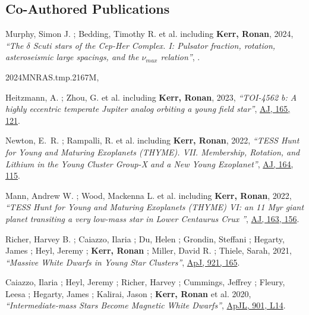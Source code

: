 \documentclass[12pt,a4paper,sans,xetex]{moderncv}        %
\begin{document}
\subsection{Co-Authored Publications}

\begin{etaremune}[topsep=0pt,itemsep=0pt,partopsep=0pt,parsep=0pt]

\item Murphy, Simon J. ;  Bedding, Timothy R. et al. including \textbf{Kerr, Ronan}, 2024, \textit{``The $\delta$ Scuti stars of the Cep-Her Complex. I: Pulsator fraction, rotation, asteroseismic large spacings, and the $\nu_{max}$ relation''}, \href{https://ui.adsabs.harvard.edu/abs/2024MNRAS.tmp.2167M/abstract}{}.

2024MNRAS.tmp.2167M,

\item Heitzmann, A. ; Zhou, G. et al. including \textbf{Kerr, Ronan}, 2023, \textit{``TOI-4562 b: A highly eccentric temperate Jupiter analog orbiting a young field star''}, 
\href{https://ui.adsabs.harvard.edu/abs/2023AJ....165..121H/abstract}{AJ, 165, 121}.

\item  Newton, E.~R. ; Rampalli, R. et al. including \textbf{Kerr, Ronan}, 2022, \textit{``TESS Hunt for Young and Maturing Exoplanets (THYME). VII. Membership, Rotation, and Lithium in the Young Cluster Group-X and a New Young Exoplanet''}, 
\href{https://ui.adsabs.harvard.edu/abs/2022AJ....164..115N/abstract}{AJ, 164, 115}.

\item  Mann, Andrew W. ;  Wood, Mackenna L. et al. including \textbf{Kerr, Ronan}, 2022, \textit{``TESS Hunt for Young and Maturing Exoplanets (THYME) VI: an 11 Myr giant planet transiting a very low-mass star in Lower Centaurus Crux ''}, 
\href{https://ui.adsabs.harvard.edu/abs/2022AJ....163..156M/abstract}{AJ, 163, 156}.

\item Richer, Harvey B. ;  Caiazzo, Ilaria ;  Du, Helen ;  Grondin, Steffani ;  Hegarty, James ; Heyl, Jeremy ;  \textbf{Kerr, Ronan} ;  Miller, David R. ;  Thiele, Sarah, 2021, \textit{``Massive White Dwarfs in Young Star Clusters''}, \href{https://ui.adsabs.harvard.edu/abs/2021ApJ...912..165R/abstract}{ApJ, 921, 165}.

\item Caiazzo, Ilaria ;  Heyl, Jeremy ;  Richer, Harvey ;  Cummings, Jeffrey ; Fleury, Leesa ;  Hegarty, James ;  Kalirai, Jason ; \textbf{Kerr, Ronan} et al. 2020, \textit{``Intermediate-mass Stars Become Magnetic White Dwarfs''}, \href{https://ui.adsabs.harvard.edu/abs/2020ApJ...901L..14C/abstract}{ApJL, 901, L14}.
\end{etaremune}
\end{document}
